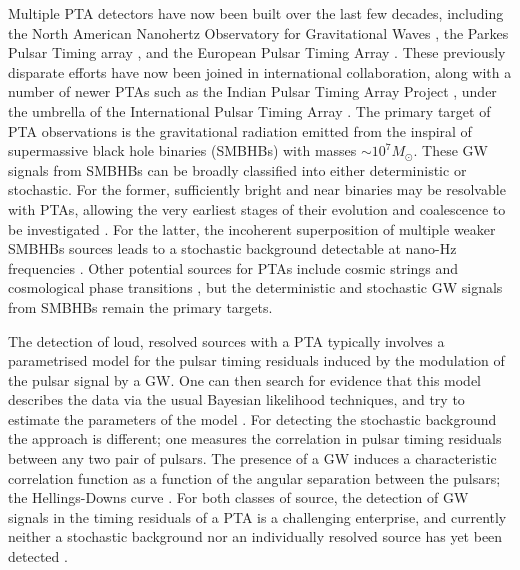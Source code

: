 \documentclass[fleqn,usenatbib,useAMS]{mnras}
\begin{document}
\noindent Multiple PTA detectors have now been built over the last few decades, including the North American Nanohertz Observatory for Gravitational Waves \citep[NANOGrav,][]{2020ApJ...905L..34A}, the Parkes Pulsar Timing array \citep[PPTA][]{2020PASA...37...20K}, and the European Pulsar Timing Array \citep[EPTA,][]{2010CQGra..27h4014F}. These previously disparate efforts have now been joined in international collaboration, along with a number of newer PTAs such as the Indian Pulsar Timing Array Project \citep[InPTA,][]{ipta}, under the umbrella of the International Pulsar Timing Array \citep[IPTA][]{2019MNRAS.490.4666P}. The primary target of PTA observations is the gravitational radiation emitted from the inspiral of supermassive black hole binaries (SMBHBs) with masses $\sim 10^7 M_{\odot}$. These GW signals from SMBHBs can be broadly classified into either deterministic or stochastic. For the former, sufficiently bright and near binaries may be resolvable with PTAs, allowing the very earliest stages of their evolution and coalescence to be investigated \citep{Zhu10}. For the latter, the incoherent superposition of multiple weaker SMBHBs sources leads to a stochastic background detectable at nano-Hz frequencies \citep{Sesana10}. Other potential sources for PTAs include cosmic strings \citep[e.g.][]{PTAstring} and cosmological phase transitions \citep[e.g.][]{PTAphase}, but the deterministic and stochastic GW signals from SMBHBs remain the primary targets. \newline 

\noindent The detection of loud, resolved sources with a PTA typically involves a parametrised model for the pulsar timing residuals induced by the modulation of the pulsar signal by a GW. One can then search for evidence that this model describes the data via the usual Bayesian likelihood techniques, and try to estimate the parameters of the model \citep[e.g.][]{Babak2016}. For detecting the stochastic background the approach is different; one measures the correlation in pulsar timing residuals between any two pair of pulsars. The presence of a GW induces a characteristic correlation function as a function of the angular separation between the pulsars; the Hellings-Downs curve \citep{Hellings}. For both classes of source, the detection of GW signals in the timing residuals of a PTA is a challenging enterprise, and currently neither a stochastic background nor an individually resolved source has yet been detected \citep{2022MNRAS.510.4873A, 10.1093/nsr/nwx126}. \newline 
\end{document}
